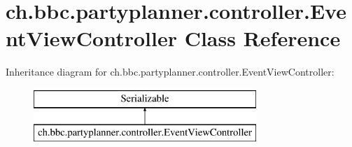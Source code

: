 \hypertarget{classch_1_1bbc_1_1partyplanner_1_1controller_1_1_event_view_controller}{}\section{ch.\+bbc.\+partyplanner.\+controller.\+Event\+View\+Controller Class Reference}
\label{classch_1_1bbc_1_1partyplanner_1_1controller_1_1_event_view_controller}
Inheritance diagram for ch.\+bbc.\+partyplanner.\+controller.\+Event\+View\+Controller\+:\begin{figure}[H]
\begin{center}
\leavevmode
\includegraphics[height=2.000000cm]{classch_1_1bbc_1_1partyplanner_1_1controller_1_1_event_view_controller}
\end{center}
\end{figure}
